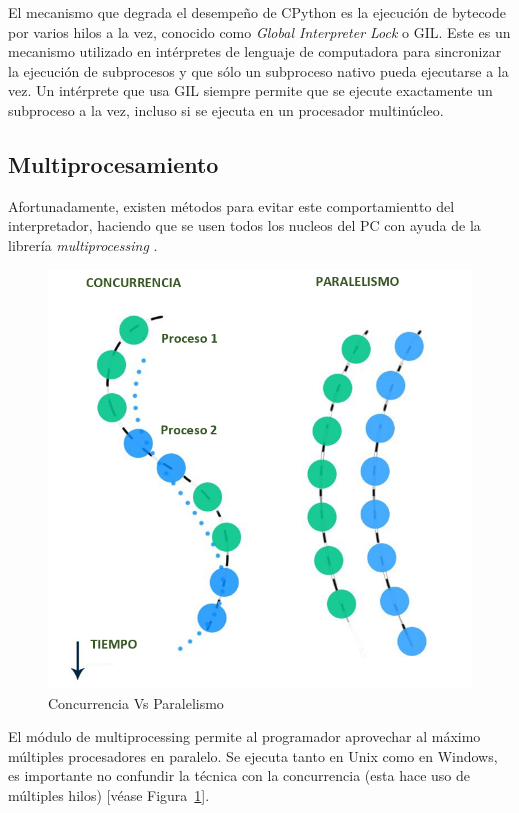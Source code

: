El mecanismo que degrada el desempeño de CPython es la ejecución de bytecode por varios hilos a la vez, conocido como \textit{Global Interpreter Lock} o GIL. Este es un mecanismo utilizado en intérpretes de lenguaje de computadora para sincronizar la ejecución de subprocesos y que sólo un subproceso nativo pueda ejecutarse a la vez. Un intérprete que usa GIL siempre permite que se ejecute exactamente un subproceso a la vez, incluso si se ejecuta en un procesador multinúcleo.

\subsection{Multiprocesamiento}
Afortunadamente, existen métodos para evitar este comportamientto del interpretador, haciendo que se usen todos los nucleos del PC con ayuda de la librería \textit{multiprocessing} \parencite{Multiprocessing}.\newline
\begin{figure}[th]
    \centering
    \includegraphics[scale=.33]{Figures/Multiprocesamiento}
    \decoRule
    \caption[Concurrencia Vs Paralelismo]{Concurrencia  Vs Paralelismo}
    \label{fig:multiprocessing}
\end{figure}

El módulo de multiprocessing permite al programador aprovechar al máximo múltiples procesadores en paralelo. Se ejecuta tanto en Unix como en Windows, es importante no confundir la técnica con la concurrencia (esta hace uso de múltiples hilos) [véase Figura~\ref{fig:multiprocessing}].
\hfill 
\break